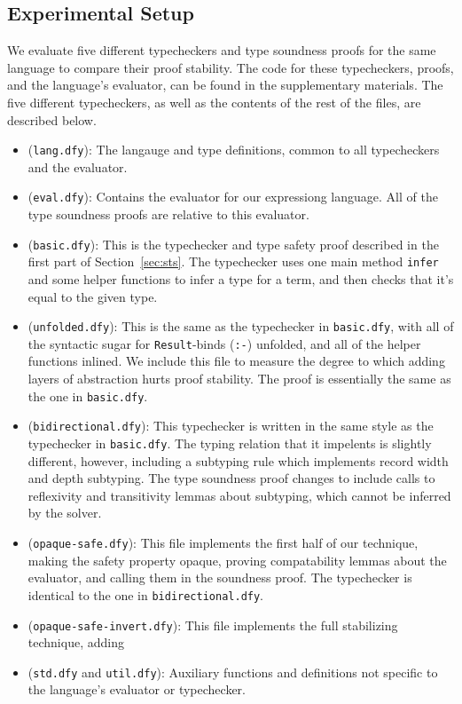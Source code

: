 \documentclass[sigplan,review,screen,anonymous]{acmart}
\begin{document}
\subsection*{Experimental Setup}
We evaluate five different typecheckers and type soundness proofs for the same
language to compare their proof stability.  The code for these typecheckers, proofs, and the language's evaluator, can be found in
the supplementary materials. The five different typecheckers, as well as the contents of the rest of the files, are described below.

\begin{itemize}
  \item (\texttt{lang.dfy}): The langauge and type definitions, common to all typecheckers and the evaluator.
  \item (\texttt{eval.dfy}): Contains the evaluator for our expressiong language. All of the type soundness proofs are relative to this evaluator.
  \item (\texttt{basic.dfy}): This is the typechecker and type safety proof described in
  the first part of Section~\ref{sec:sts}.  The typechecker uses one main method
  \texttt{infer} and some helper functions to infer a type for a term, and then checks
  that it's equal to the given type.
  \item (\texttt{unfolded.dfy}): This is the same as the typechecker in \texttt{basic.dfy}, with all of the
  syntactic sugar for \texttt{Result}-binds (\texttt{:-}) unfolded, and all of the helper
  functions inlined. We include this file to measure the degree to which adding
  layers of abstraction hurts proof stability. The proof is essentially the same as the one in \texttt{basic.dfy}.
  \item (\texttt{bidirectional.dfy}): This typechecker is written in the same style as the typechecker in \texttt{basic.dfy}. The typing relation that it impelents is slightly different,
        however, including a subtyping rule which implements record width and depth subtyping.
        The type soundness proof changes to include calls to reflexivity and transitivity lemmas about subtyping, which cannot be inferred by the solver.
  \item (\texttt{opaque-safe.dfy}):
        This file implements the first half of our technique, making the safety
        property opaque, proving compatability lemmas about the evaluator, and
        calling them in the soundness proof.  The typechecker is identical to
        the one in \texttt{bidirectional.dfy}.
  \item (\texttt{opaque-safe-invert.dfy}): This file implements the full stabilizing technique, adding
  \item (\texttt{std.dfy} and \texttt{util.dfy}): Auxiliary functions and definitions not specific to the language's evaluator or typechecker.
\end{itemize}
\end{document}
